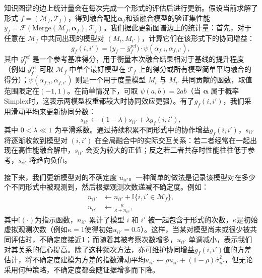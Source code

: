 \documentclass[../main.tex]{subfiles}
\begin{document}
知识图谱的边上统计量会在每次完成一个形式的评估后进行更新。假设当前求解了形式 $f=(\mathcal{M}_f,\mathcal{T}_f)$，得到融合配比$\boldsymbol{\alpha}_f$和该融合模型的验证集性能$y_f=\mathcal{F}(\mathrm{Merge}(\mathcal{M}_f,\boldsymbol{\alpha}_f), \mathcal{T}_f)$。我们据此更新图谱边上的统计量：首先，对于任意在 $\mathcal{M}_f$ 中共同出现的模型对 $(M_i, M_{i'})$，计算它们在该形式下的协同增益：
\begin{equation}
	g_f(i,i') = \Big(y_f - \bar{y}^{\text{ref}}_f\Big) \cdot \psi(\alpha_{f,i}, \alpha_{f,i'}),
\end{equation}
其中 $\bar{y}^{\text{ref}}_f$ 是一个参考基准得分，用于衡量本次融合结果相对于基线的提升程度（例如 $\bar{y}^{\text{ref}}_f$ 可取 $\mathcal{M}_f$ 中单个最好模型在 $\mathcal{T}_f$ 上的得分或所有模型简单平均融合的得分）；$\psi(\alpha_{f,i},\alpha_{f,i'})$ 则是一个用于度量模型 $M_i$ 与 $M_{i'}$ 共同贡献的函数，取值范围限定在$(-1,1)$。在简单情况下，可取 $\psi(a,b)=2ab$（当 $\boldsymbol{\alpha}$ 属于概率Simplex时，这表示两模型权重都较大时协同效应更强）。有了$g_f(i,i')$，我们采用滑动平均来更新协同分数：
\begin{equation}
	s_{ii'} \leftarrow (1-\lambda) s_{ii'} + \lambda g_f(i,i'),
\end{equation}
其中 $0<\lambda\ll 1$ 为平滑系数。通过持续积累不同形式中的协作增益$g_f(i,i')$，$s_{ii'}$ 将逐渐收敛到模型对 $(i,i')$ 在全局融合中的实际交互关系：若二者经常在一起出现在高性能融合解中，$s_{ii'}$ 会变为较大的正值；反之若二者共存时性能往往低于参考，$s_{ii'}$ 将趋向负值。

接下来，我们更新模型对的不确定度 $u_{ii'}$。一种简单的做法是记录该模型对在多少个不同形式中被观测到，然后根据观测次数递减不确定度。例如：
\begin{equation}
	\begin{aligned}
		n_{ii'} & \leftarrow n_{ii'} + \mathbb{I}\{i,i'\in\mathcal{M}_f\}, \\
		u_{ii'} & \leftarrow \frac{\kappa}{\kappa + n_{ii'}},
	\end{aligned}
\end{equation}
其中$\mathbb{I}(\cdot)$为指示函数，$n_{ii'}$ 累计了模型 $i$ 和 $i'$ 被一起包含于形式的次数，$\kappa$是初始虚拟观测次数（例如$\kappa=1$使得初始$u_{ii'}=0.5$）。这样，当某对模型尚未或很少被共同评估时，不确定度接近1；而随着其被考察次数增多，$u_{ii'}$ 单调减小，表示我们对其关系的信心提高。除了这种频次方法，亦可维护协同增益$g_f(i,i')$值的方差估计，将不确定度建模为方差的指数滑动平均$u_{ii'} \leftarrow \rho u_{ii'} + (1-\rho)\hat{\sigma}_{ii'}^2$，但无论采用何种策略，不确定度都会随证据增多而下降。
\end{document}
